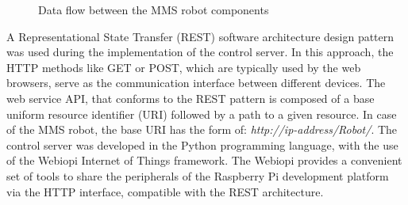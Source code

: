 \begin{figure}[H]
\begin{center}

\caption{Data flow between the MMS robot components}

\label{fig:softdesign}

\end{center}
\end{figure}

A Representational State Transfer (REST) \cite{wikipedia} software architecture design pattern was used during the implementation of the control server. In this approach, the HTTP methods like GET or POST, which are typically used by the web browsers, serve as the communication interface between different devices. The web service API, that conforms to the REST pattern is composed of a base uniform resource identifier (URI) followed by a path to a given resource. In case of the MMS robot, the base URI has the form of: \textit{http://ip-address/Robot/}. The control server was developed in the Python programming language, with the use of the Webiopi \cite{webiopi} Internet of Things framework. The Webiopi provides a convenient set of tools to share the peripherals of the Raspberry Pi development platform via the HTTP interface, compatible with the REST architecture.

